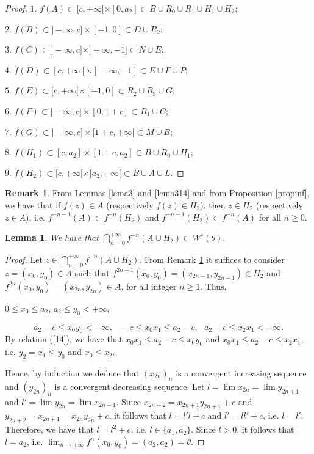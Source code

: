\documentclass[11pt]{amsart}
\newtheorem{lemma}[theorem]{Lemma}
\theoremstyle{definition}
\newtheorem{remark}{Remark}
\begin{document}
\begin{proof} $1.$ $f(A)\subset [c,+\infty[\times [0,a_2]\subset B\cup R_0\cup R_1\cup H_1\cup H_2$;
	
	\noindent $2.$ $f(B)\subset ]-\infty,c]\times [-1,0]\subset D\cup R_2$;
	
	\noindent $3.$ $f(C)\subset ]-\infty,c]\times ]-\infty,-1]\subset N\cup E$;
	
	\noindent $4.$ $f(D)\subset [c,+\infty[\times ]-\infty,-1]\subset E\cup F\cup P$;
	
	\noindent $5.$ $f(E)\subset [c,+\infty[\times [-1,0]\subset R_2\cup R_3\cup G$;
	
	\noindent $6.$ $f(F)\subset ]-\infty,c]\times [0,1+c]\subset R_1\cup C$;
	
	\noindent $7.$ $f(G)\subset ]-\infty,c]\times [1+c,+\infty[\subset M\cup B$;
	
	\noindent $8.$ $f(H_1)\subset [c,a_2]\times [1+c,a_2]\subset B\cup R_0\cup H_1$;
	
	\noindent $9.$ $f(H_2)\subset [c,+\infty[\times [a_2,+\infty[\subset B\cup A\cup L$.
\end{proof}

\begin{remark}From Lemmas \ref{lema3} and \ref{lema314} and from Proposition \ref{propinf}, we have that if $f(z)\in A$ (respectively $f(z)\in H_2$), then $z\in  H_2$ (respectively $z\in A$), i.e. $f^{-n-1}(A)\subset f^{-n}( H_2)$ and $f^{-n-1}(H_2)\subset f^{-n}(A)$ for all $n\geq 0$. \label{obsnova}
\end{remark}

\begin{lemma}
We have that $\displaystyle \bigcap_{n=0}^{+\infty}f^{-n}(A\cup H_2)\subset W^s(\theta)$. \label{propa2}
\end{lemma}
\begin{proof}
Let $z\in\bigcap_{n=0}^{+\infty}f^{-n}(A\cup H_2)$.	From Remark \ref{obsnova} it suffices to consider $z=(x_0,y_0)\in A$ such that $f^{2n-1}(x_0,y_0)=(x_{2n-1},y_{2n-1})\in H_2$ and $f^{2n}(x_0,y_0)=(x_{2n},y_{2n})\in A$, for all integer $n\geq 1$. Thus,
	\begin{center}
		$0\leq x_0\leq a_2$, $a_2\leq y_0<+\infty$,
	\end{center}
	\begin{equation}
	a_2-c\leq x_0y_0<+\infty, \textrm{  } -c\leq x_0x_1\leq a_2-c, \textrm{  } a_2-c\leq x_2x_1<+\infty. \label{14}
	\end{equation}
	By relation (\ref{14}), we have that $x_0x_1\leq a_2-c\leq x_0y_0$ and $x_0x_1\leq a_2-c\leq x_2x_1$, i.e. $y_2=x_1\leq y_0$ and $x_0\leq x_2$.
	
	Hence, by induction we deduce that $(x_{2n})_n$ is a convergent increasing sequence and $(y_{2n})_n$ is a convergent decreasing sequence. Let $l=\lim x_{2n}=\lim y_{2n+1}$ and $l'=\lim y_{2n}=\lim x_{2n-1}$. Since $x_{2n+2}=x_{2n+1}y_{2n+1}+c$ and $y_{2n+2}=x_{2n+1}=x_{2n}y_{2n}+c$, it follows that $l=l'l+c$ and $l'=ll'+c$, i.e. $l=l'$. Therefore, we have that $l=l^2+c$, i.e. $l\in\{a_1,a_2\}$. Since $l>0$, it follows that $l=a_2$, i.e. $\lim_{n\to+\infty}f^n(x_0,y_0)=(a_2,a_2)=\theta$.
\end{proof}
\end{document}
